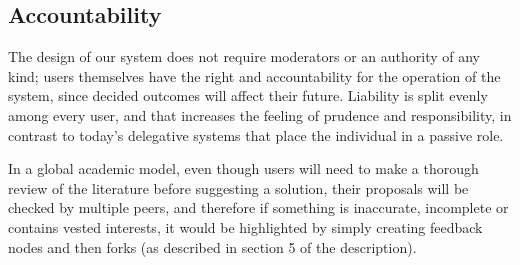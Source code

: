 \documentclass[a4paper,11pt]{article}
\begin{document}
\begin{multicols}{2}
\subsection{Accountability} \label{accountability}

The design of our system does not require moderators or an authority of any kind; users themselves have the right and accountability for the operation of the system, since decided outcomes will affect their future. Liability is split evenly among every user, and that increases the feeling of prudence and responsibility, in contrast to today's delegative systems that place the individual in a passive role.

In a global academic model, even though users will need to make a thorough review of the literature before suggesting a solution, their proposals will be checked by multiple peers, and therefore if something is inaccurate, incomplete or contains vested interests, it would be highlighted by simply creating feedback nodes and then forks (as described in section 5 of the description).


\end{multicols}
\end{document}
